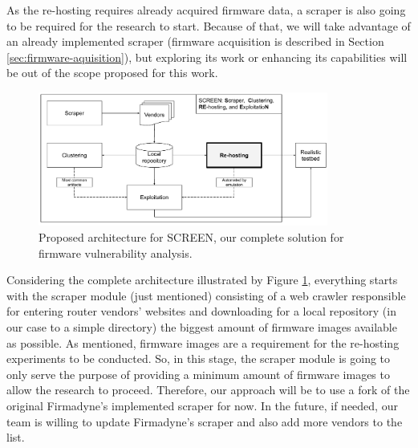 As the re-hosting requires already acquired firmware data, a scraper is also going to be required for the research to start. Because of that, we will take advantage of an already implemented scraper (firmware acquisition is described in Section \ref{sec:firmware-aquisition}), but exploring its work or enhancing its capabilities will be out of the scope proposed for this work.

\begin{figure}[h]
    \centering
    \includegraphics[width=0.85\textwidth]{figs/screen.pdf}
    \caption{Proposed architecture for SCREEN, our complete solution for firmware vulnerability analysis.}
    \label{fig:architecture}
\end{figure}


Considering the complete architecture illustrated by Figure \ref{fig:architecture}, everything starts with the scraper module (just mentioned) consisting of a web crawler responsible for entering router vendors' websites and downloading for a local repository (in our case to a simple directory) the biggest amount of firmware images available as possible. As mentioned, firmware images are a requirement for the re-hosting experiments to be conducted. So, in this stage, the scraper module is going to only serve the purpose of providing a minimum amount of firmware images to allow the research to proceed. Therefore, our approach will be to use a fork of the original Firmadyne's \cite{firmadyne} implemented scraper for now. In the future, if needed, our team is willing to update Firmadyne's scraper and also add more vendors to the list.


